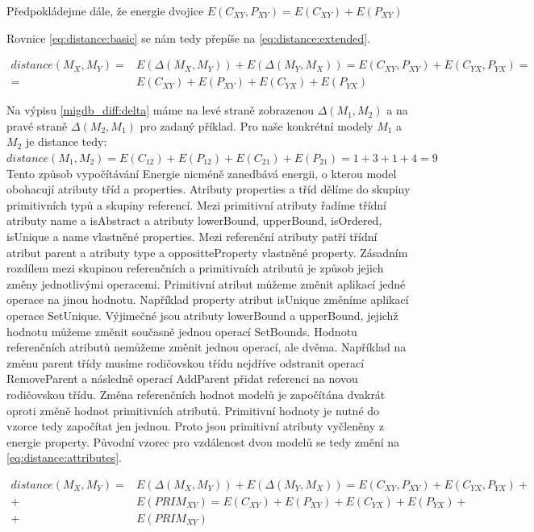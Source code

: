 \documentclass[11pt,twoside,a4paper]{book}
\begin{document}
Předpokládejme dále, že energie dvojice $E(C_{XY}, P_{XY}) = E(C_{XY}) +
E(P_{XY})$ 

Rovnice \eqref{eq:distance:basic} se nám tedy přepíše na
\eqref{eq:distance:extended}.

\begin{align} distance(M_X,M_Y) = & E(\Delta(M_X,M_Y)) + E(\Delta(M_Y, M_X)) =
E(C_{XY}, P_{XY}) + E(C_{YX}, P_{YX}) = \nonumber \\ = & E(C_{XY}) + E(P_{XY}) +
E(C_{YX}) + E(P_{YX}) \label{eq:distance:extended}
\end{align}



Na výpisu \ref{migdb_diff:delta} máme na levé straně zobrazenou
$\Delta(M_1,M_2)$ a na pravé straně $\Delta(M_2,M_1)$ pro zadaný příklad. Pro
naše konkrétní modely $M_1$ a $M_2$ je distance tedy:\\

$distance(M_1,M_2) = E(C_{12}) + E(P_{12}) + E(C_{21}) + E(P_{21}) = 1 + 3 +
1 + 4 = 9$\\

Tento způsob vypočítávání Energie nicméně zanedbává energii, o kterou model
obohacují atributy tříd a properties. Atributy properties a tříd dělíme do
skupiny primitivních typů a skupiny referencí. Mezi primitivní atributy řadíme
třídní atributy name a isAbstract a atributy lowerBound, upperBound,
isOrdered, isUnique a name vlastněné properties. Mezi referenční atributy patří
třídní atribut parent a atributy type a oppositteProperty vlastněné property. Zásadním
rozdílem mezi skupinou referenčních a primitivních atributů je způsob jejich
změny jednotlivými operacemi. Primitivní atribut můžeme změnit aplikací jedné
operace na jinou hodnotu. Například property atribut isUnique změníme
aplikací operace SetUnique. Výjimečné jsou atributy lowerBound a upperBound,
jejichž hodnotu můžeme změnit současně jednou operací SetBounds.
Hodnotu referenčních atributů nemůžeme změnit jednou operací, ale
dvěma. Například na změnu parent třídy musíme rodičovskou třídu nejdříve
odstranit operací RemoveParent a následně operací AddParent přidat
referenci na novou rodičovskou třídu. Změna referenčních hodnot modelů je
započítána dvakrát oproti změně hodnot primitivních atributů. Primitivní
hodnoty je nutné do vzorce tedy započítat jen jednou. Proto jsou
primitivní atributy vyčleněny z energie property. Původní vzorec pro vzdálenost
dvou modelů se tedy změní na \eqref{eq:distance:attributes}.

\begin{align} distance(M_X,M_Y) = & E(\Delta(M_X,M_Y)) + E(\Delta(M_Y, M_X)) =
E(C_{XY}, P_{XY}) + E(C_{YX}, P_{YX}) + \nonumber \\ + & E(PRIM_{XY}) = 
E(C_{XY}) + E(P_{XY}) + E(C_{YX}) + E(P_{YX}) + \nonumber \\ + & E(PRIM_{XY})
\label{eq:distance:attributes}
\end{align}
\end{document}
